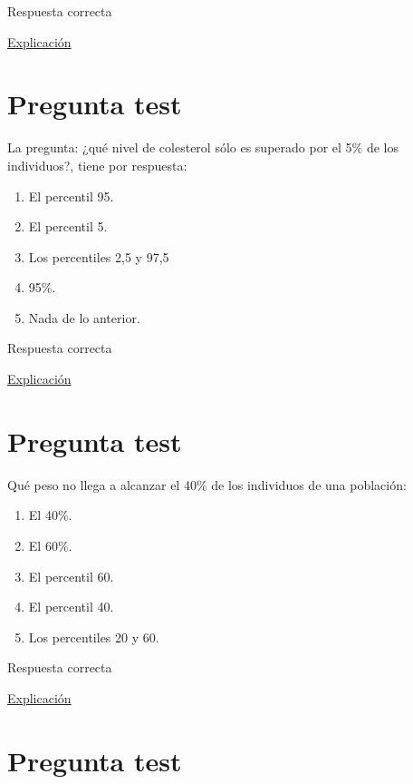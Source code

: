 \documentclass[
]{book}
\providecommand{\tightlist}{%
  \setlength{\itemsep}{0pt}\setlength{\parskip}{0pt}}
\begin{document}
Respuesta correcta

\href{https://1fjmanzano.github.io/bioestadistica/medidas-de-forma.html}{Explicación}

\hypertarget{pregunta-test-42}{%
\section{Pregunta test}\label{pregunta-test-42}}

La pregunta: ¿qué nivel de colesterol sólo es superado por el 5\% de los individuos?, tiene por respuesta:

\begin{enumerate}
\def\labelenumi{\alph{enumi})}
\tightlist
\item
  El percentil 95.
\item
  El percentil 5.
\item
  Los percentiles 2,5 y 97,5
\item
  95\%.
\item
  Nada de lo anterior.
\end{enumerate}

Respuesta correcta

\href{https://1fjmanzano.github.io/bioestadistica/medidas-de-posicio\%CC\%81n-dispersio\%CC\%81n-y-forma.html\#medidas-de-posicio\%CC\%81n-no-centrales}{Explicación}

\hypertarget{pregunta-test-43}{%
\section{Pregunta test}\label{pregunta-test-43}}

Qué peso no llega a alcanzar el 40\% de los individuos de una población:

\begin{enumerate}
\def\labelenumi{\alph{enumi})}
\tightlist
\item
  El 40\%.
\item
  El 60\%.
\item
  El percentil 60.
\item
  El percentil 40.
\item
  Los percentiles 20 y 60.
\end{enumerate}

Respuesta correcta

\href{https://1fjmanzano.github.io/bioestadistica/medidas-de-posicio\%CC\%81n-dispersio\%CC\%81n-y-forma.html\#medidas-de-posicio\%CC\%81n-no-centrales}{Explicación}

\hypertarget{pregunta-test-44}{%
\section{Pregunta test}\label{pregunta-test-44}}
\end{document}
